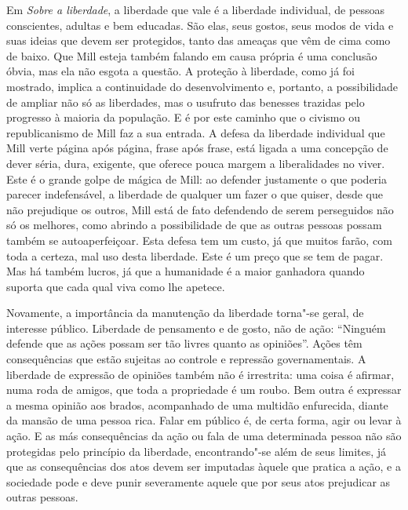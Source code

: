 Em \textit{Sobre a liberdade}, a liberdade que vale é a
liberdade individual, de pessoas conscientes, adultas e bem educadas.
São elas, seus gostos, seus modos de vida e suas ideias que devem ser
protegidos, tanto das ameaças que vêm de cima como de baixo. Que
Mill esteja também falando em causa própria é uma conclusão óbvia, mas
ela não esgota a questão. A proteção à liberdade, como já foi mostrado,
implica a continuidade do desenvolvimento e, portanto, a possibilidade
de ampliar não só as liberdades, mas o usufruto das benesses trazidas
pelo progresso à maioria da população. E é por este caminho que o
civismo ou republicanismo de Mill faz a sua entrada. A defesa da
liberdade individual que Mill verte página após página, frase após
frase, está ligada a uma concepção de dever séria, dura, exigente, que
oferece pouca margem a liberalidades no viver. Este é o grande golpe de
mágica de Mill: ao defender justamente o que poderia parecer
indefensável, a liberdade de qualquer um fazer o que quiser, desde que
não prejudique os outros, Mill está de fato defendendo de serem
perseguidos não só os melhores, como abrindo a possibilidade de que as
outras pessoas possam também se autoaperfeiçoar. Esta defesa tem um
custo, já que muitos farão, com toda a certeza, mal uso desta
liberdade. Este é um preço que se tem de pagar. Mas há também lucros,
já que a humanidade é a maior ganhadora quando suporta que cada qual
viva como lhe apetece. 

Novamente, a importância da manutenção da liberdade torna"-se geral, de
interesse público. Liberdade de pensamento e de gosto, não de ação:
``Ninguém defende que as ações possam ser tão livres quanto as
opiniões''. Ações têm consequências que estão sujeitas ao controle e
repressão governamentais. A liberdade de expressão de opiniões também
não é irrestrita: uma coisa é afirmar, numa roda de amigos, que toda a
propriedade é um roubo. Bem outra é expressar a mesma opinião aos
brados, acompanhado de uma multidão enfurecida, diante da mansão de uma
pessoa rica. Falar em público é, de certa forma, agir ou levar à ação.
E as más consequências da ação ou fala de uma determinada pessoa não
são protegidas pelo princípio da liberdade, encontrando"-se além de
seus limites, já que as consequências dos atos devem ser imputadas
àquele que pratica a ação, e a sociedade pode e deve punir severamente
aquele que por seus atos prejudicar as outras pessoas. 

